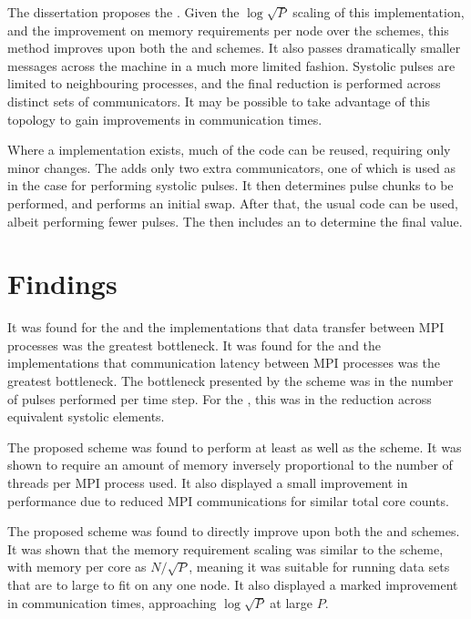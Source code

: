 The dissertation proposes the \replicatedsystolicloop{}.
%
Given the $\log{\sqrt{P}}$ scaling of this implementation, and the
improvement on memory requirements per node over the \replicateddata{}
schemes, this method improves upon both the \replicateddata{} and
\systolicloop{} schemes.
%
It also passes dramatically smaller messages across the machine
in a much more limited fashion.
%
Systolic pulses are limited to neighbouring processes, and the final
reduction is performed across distinct sets of communicators.
%
It may be possible to take advantage of this topology to gain
improvements in communication times.

Where a \systolicloop{} implementation exists, much of the code can
be reused, requiring only minor changes.
%
The \replicatedsystolicloop{} adds only two extra
communicators, one of which is used as in the \systolicloop{} case
for performing systolic pulses.
%
It then determines pulse chunks to be performed, and performs
an initial swap.
%
After that, the usual \systolicloop{} code can be used, albeit performing
fewer pulses.
%
The \replicatedsystolicloop{} then includes an \mpiallreduce{} to determine
the final value.



\section{Findings}

It was found for the \replicateddata{} and the \sharedandreplicateddata{}
implementations that
data transfer between MPI processes was the greatest bottleneck.
%
It was found for the \systolicloop{} and the \replicatedsystolicloop{}
implementations that
communication latency between MPI processes was the greatest bottleneck.
%
The bottleneck presented by the \systolicloop{} scheme was in
the number of pulses performed per time step.
%
For the \replicatedsystolicloop{}, this was in the reduction across
equivalent systolic elements.

The proposed \sharedandreplicateddata{} scheme was found to perform at
least as well as the \replicateddata{} scheme.
%
It was  shown to require
an amount of memory inversely proportional to the number of
\openmp{} threads per MPI process used.
%
It also displayed a small improvement in performance due to
reduced MPI communications for similar total core counts.

The proposed \replicatedsystolicloop{} scheme was found to directly
improve upon both the \replicateddata{} and \systolicloop{} schemes.
%
It was shown that the memory requirement scaling was similar to
the \systolicloop{} scheme, with memory per core as $N/\sqrt{P}$,
meaning it was suitable for running data sets that are to large to
fit on any one node.
%
It also displayed a marked improvement in communication times,
approaching $\log{\sqrt{P}}$ at large $P$.



